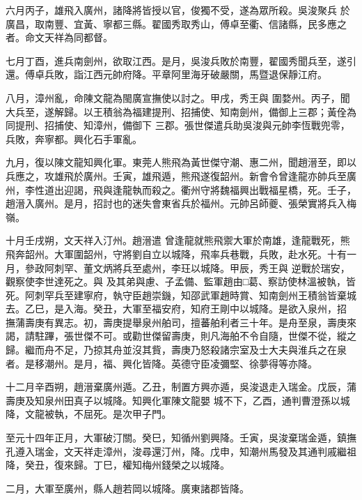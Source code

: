 \begin{pinyinscope}
 六月丙子，雄飛入廣州，諸降將皆授以官，俊獨不受，遂為眾所殺。吳浚聚兵
 於廣昌，取南豐、宜黃、寧都三縣。翟國秀取秀山，傅卓至衢、信諸縣，民多應之者。命文天祥為同都督。



 七月丁酉，進兵南劍州，欲取江西。是月，吳浚兵敗於南豐，翟國秀聞兵至，遂引還。傅卓兵敗，詣江西元帥府降。平章阿里海牙破嚴關，馬暨退保靜江府。


八月，漳州亂，命陳文龍為閩廣宣撫使以討之。甲戌，秀王與
 圍婺州。丙子，聞大兵至，遂解歸。以王積翁為福建提刑、招捕使、知南劍州，備御上三郡；黃佺為同提刑、招捕使、知漳州，備御下
 三郡。張世傑遣兵助吳浚與元帥李恆戰兜零，兵敗，奔寧都。興化石手軍亂。



 九月，復以陳文龍知興化軍。東莞人熊飛為黃世傑守潮、惠二州，聞趙溍至，即以兵應之，攻雄飛於廣州。壬寅，雄飛遁，熊飛遂復韶州。新會令曾逢龍亦帥兵至廣州，李性道出迎謁，飛與逢龍執而殺之。衢州守將魏福興出戰福星橋，死。壬子，趙溍入廣州。是月，招討也的迷失會東省兵於福州。元帥呂師夔、張榮實將兵入梅嶺。


十月壬戌朔，文天祥入汀州。趙溍遣
 曾逢龍就熊飛禦大軍於南雄，逢龍戰死，熊飛奔韶州。大軍圍韶州，守將劉自立以城降，飛率兵巷戰，兵敗，赴水死。十有一月，參政阿刺罕、董文炳將兵至處州，李玨以城降。甲辰，秀王與
 逆戰於瑞安，觀察使李世達死之。與
 及其弟與慮、子孟備、監軍趙由□葛、察訪使林溫被執，皆死。阿刺罕兵至建寧府，執守臣趙崇鐖，知邵武軍趙時賞、知南劍州王積翁皆棄城去。乙巳，是入海。癸丑，大軍至福安府，知府王剛中以城降。是欲入泉州，招
 撫蒲壽庚有異志。初，壽庚提舉泉州舶司，擅蕃舶利者三十年。是舟至泉，壽庚來謁，請駐蹕，張世傑不可。或勸世傑留壽庚，則凡海舶不令自隨，世傑不從，縱之歸。繼而舟不足，乃掠其舟並沒其貲，壽庚乃怒殺諸宗室及士大夫與淮兵之在泉者。是移潮州。是月，福、興化皆降。英德守臣凌彌堅、徐夢得等亦降。



 十二月辛酉朔，趙溍棄廣州遁。乙丑，制置方興亦遁，吳浚退走入瑞金。戊辰，蒲壽庚及知泉州田真子以城降。知興化軍陳文龍嬰
 城不下，乙酉，通判曹澄孫以城降，文龍被執，不屈死。是次甲子門。



 至元十四年正月，大軍破汀關。癸巳，知循州劉興降。壬寅，吳浚棄瑞金遁，鎮撫孔遵入瑞金，文天祥走漳州，浚尋還汀州，降。戊申，知潮州馬發及其通判戚繼祖降，癸丑，復來歸。丁巳，權知梅州錢榮之以城降。



 二月，大軍至廣州，縣人趙若岡以城降。廣東諸郡皆降。




\end{pinyinscope}
